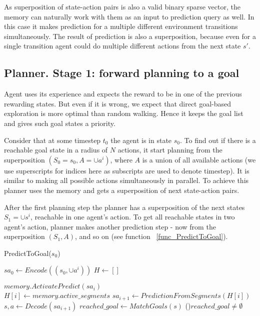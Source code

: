 \documentclass[runningheads]{llncs}
\begin{document}
As superposition of state-action pairs is also a valid binary sparse vector, the memory can naturally work with them as an input to prediction query as well. In this case it makes prediction for a multiple different environment transitions simultaneously. The result of prediction is also a superposition, because even for a single transition agent could do multiple different actions from the next state $s'$.

\subsection{Planner. Stage 1: forward planning to a goal}

Agent uses its experience and expects the reward to be in one of the previous rewarding states. But even if it is wrong, we expect that direct goal-based exploration is more optimal than random walking. Hence it keeps the goal list and gives such goal states a priority.

Consider that at some timestep $t_0$ the agent is in state $s_0$. To find out if there is a reachable goal state in a radius of $N$ actions, it start planning from the superposition $(S_0 = s_0, A = \cup a^i)$, where $A$ is a union of all available actions (we use superscripts for indices here as subscripts are used to denote timestep). It is similar to making all possible actions simultaneously in parallel. To achieve this planner uses the memory and gets a superposition of next state-action pairs.

After the first planning step the planner has a superposition of the next states $S_1 = \cup s^i$, reachable in one agent's action. To get all reachable states in two agent's action, planner makes another prediction step - now from the superposition $(S_1, A)$, and so on (see function ~\ref{func_PredictToGoal}).

\begin{function}
  \caption{PredictToGoal($s_0$)} \label{func_PredictToGoal}
  \SetNoFillComment

  $sa_0 \leftarrow Encode((s_0, \cup a^i))$ 
  $H \leftarrow []$ 

   {
    $memory.ActivatePredict(sa_i)$ \;
    \quad \\

    $H[i] \leftarrow memory.active\_segments$ \;
    $sa_{i+1} \leftarrow PredictionFromSegments(H[i])$ \;
    \quad \\
    
    $s, a \leftarrow Decode(sa_{i+1})$ 
    $reached\_goal \leftarrow MatchGoals(s)$ \;
    \If(){$reached\_goal \neq \emptyset$} {
       \;
    }{}
  }
  \Return{$\emptyset$}
\end{function}
\end{document}
